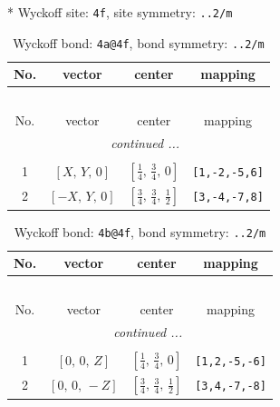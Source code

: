 \documentclass[fleqn,8pt]{jsarticle}
\begin{document}
* Wyckoff site: {\tt 4f}, site symmetry: {\tt ..2/m}
\renewcommand{\arraystretch}{1.2}
\begin{longtable}{cccc}
\caption{Wyckoff bond: {\tt 4a@4f}, bond symmetry: {\tt ..2/m}}
 \\
 \hline \hline
No. & vector & center & mapping \\ \hline \endfirsthead

\multicolumn{3}{l}{\tablename\ \thetable{}} \\
 \hline \hline
No. & vector & center & mapping \\ \hline \endhead

 \hline \hline
\multicolumn{3}{r}{\footnotesize\it continued ...} \\ \endfoot

 \hline \hline
\multicolumn{3}{r}{} \\ \endlastfoot

1 & $\left[ X,\, Y,\, 0 \right]$ & $\left[ \frac{1}{4},\, \frac{3}{4},\, 0 \right]$ & {\tt [1,-2,-5,6]} \\ \hline
2 & $\left[ - X,\, Y,\, 0 \right]$ & $\left[ \frac{3}{4},\, \frac{3}{4},\, \frac{1}{2} \right]$ & {\tt [3,-4,-7,8]} \\
\end{longtable}
\renewcommand{\arraystretch}{1.2}
\begin{longtable}{cccc}
\caption{Wyckoff bond: {\tt 4b@4f}, bond symmetry: {\tt ..2/m}}
 \\
 \hline \hline
No. & vector & center & mapping \\ \hline \endfirsthead

\multicolumn{3}{l}{\tablename\ \thetable{}} \\
 \hline \hline
No. & vector & center & mapping \\ \hline \endhead

 \hline \hline
\multicolumn{3}{r}{\footnotesize\it continued ...} \\ \endfoot

 \hline \hline
\multicolumn{3}{r}{} \\ \endlastfoot

1 & $\left[ 0,\, 0,\, Z \right]$ & $\left[ \frac{1}{4},\, \frac{3}{4},\, 0 \right]$ & {\tt [1,2,-5,-6]} \\ \hline
2 & $\left[ 0,\, 0,\, - Z \right]$ & $\left[ \frac{3}{4},\, \frac{3}{4},\, \frac{1}{2} \right]$ & {\tt [3,4,-7,-8]} \\
\end{longtable}
\renewcommand{\arraystretch}{1.2}
\end{document}
